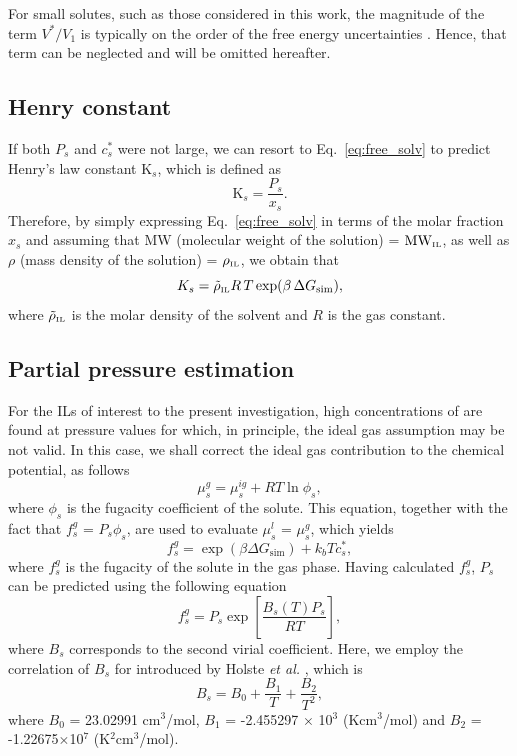 \documentclass[3p,twocolumn]{elsarticle}
\begin{document}
For small solutes, such as those considered in this work, the magnitude of the term $V^{\ast}/V_1$ is typically on the order of the free energy uncertainties \cite{Shirts_2003}.
Hence, that term can be neglected and will be omitted hereafter.

\subsection*{Henry constant}
If both $P_s$ and $c_s^{\ast}$ were not large, we can resort to Eq.~\eqref{eq:free_solv} to predict Henry's law constant $\text{K}_s$, which is defined as \cite{Prausnitz}
\begin{equation}
\text{K}_s =\frac{P_s}{x_s}.
\end{equation}
Therefore, by simply expressing Eq.~\eqref{eq:free_solv} in terms of the molar fraction $x_s$ and assuming that MW (molecular weight of the solution) = $\text{MW}_\text{\tiny IL}$, as well as $\rho$ (mass density of the solution) = $\rho_\text{\tiny IL}$, we obtain that
\begin{equation}
\label{eq:henry_eq}
K_s = \tilde{\rho}_\text{\tiny IL} R \, T \exp(\beta \, \Delta G_{\text{sim}}),
\end{equation}
where $\tilde{\rho}_\text{\tiny IL}$ is the molar density of the solvent and $R$ is the gas constant.

\subsection*{Partial pressure estimation}
\label{sec:partial_pressure}

For the ILs of interest to the present investigation, high concentrations of  are found at pressure values for which, in principle, the ideal gas assumption may be not valid.
In this case, we shall correct the ideal gas contribution to the chemical potential, as follows
\begin{equation}
\label{eq:mu_gas_real}
\mu^{g}_s = \mu^{ig}_s + RT \ln \phi_s,
\end{equation}
where $\phi_s$ is the fugacity coefficient of the solute.
This equation, together with the fact that $f^{g}_s$ = $P_s \phi_s$, are used to evaluate $\mu^{l}_s$ = $\mu^{g}_s$, which yields
\begin{equation}
\label{eq:fgas_d}
f^{g}_s = \exp  \left( \beta \Delta G_{\text{sim}} \right) +  k_b T c_s^{\ast}, 
\end{equation}
where $f^{g}_s$ is the fugacity of the solute in the gas phase.
Having calculated $f^{g}_s$, $P_s$ can be predicted using the following equation
\begin{equation}
\label{eq:fgas}
f^{g}_s = P_s \exp\left[ \frac{B_s(T) P_s}{R T} \right],
\end{equation}
where $B_s$ corresponds to the second virial coefficient.
Here, we employ the correlation of $B_s$ for  introduced by Holste \textit{et al.} \cite{Holste_1987}, which is
\begin{equation}
B_s = B_0 + \frac{B_1}{T} + \frac{B_2}{T^2},
\end{equation}
where $B_0$ = 23.02991 cm$^3$/mol, $B_1$ = -2.455297 $\times$ 10$^3$ (Kcm$^3$/mol) and $B_2$ = -1.22675$\times$10$^7$ (K$^2$cm$^3$/mol).
\end{document}
